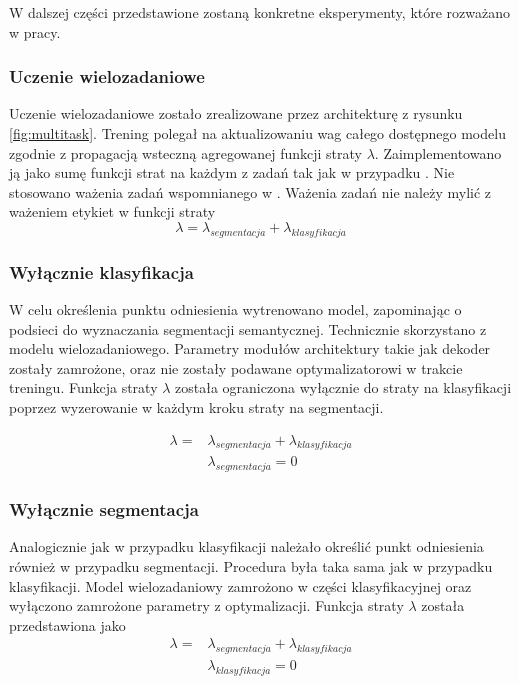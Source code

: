 W dalszej części przedstawione zostaną konkretne eksperymenty, które rozważano w pracy.

\subsubsection{Uczenie wielozadaniowe}
Uczenie wielozadaniowe zostało zrealizowane przez architekturę z rysunku \ref{fig:multitask}. Trening polegał na aktualizowaniu wag całego dostępnego modelu zgodnie z propagacją wsteczną agregowanej funkcji straty $\lambda$. Zaimplementowano ją jako sumę funkcji strat na każdym z zadań tak jak w przypadku \cite{mehta2018net}. Nie stosowano ważenia zadań wspomnianego w \cite{9892852}. Ważenia zadań nie należy mylić z ważeniem etykiet w funkcji straty
\begin{equation*}
\lambda = \lambda_{segmentacja} + \lambda_{klasyfikacja}
\end{equation*}

\subsubsection{Wyłącznie klasyfikacja}
W celu określenia punktu odniesienia wytrenowano model, zapominając o podsieci do wyznaczania segmentacji semantycznej. Technicznie skorzystano z modelu wielozadaniowego. Parametry modułów architektury takie jak dekoder zostały zamrożone, oraz nie zostały podawane optymalizatorowi w trakcie treningu. Funkcja straty $\lambda$ została ograniczona wyłącznie do straty na klasyfikacji poprzez wyzerowanie w każdym kroku straty na segmentacji.

\begin{align*}
\lambda  = & \lambda_{segmentacja} + \lambda_{klasyfikacja} \\
           & \lambda_{segmentacja} = 0
\end{align*}
\subsubsection{Wyłącznie segmentacja}
Analogicznie jak w przypadku klasyfikacji należało określić punkt odniesienia również w przypadku segmentacji. Procedura była taka sama jak w przypadku klasyfikacji. Model wielozadaniowy zamrożono w części klasyfikacyjnej oraz wyłączono zamrożone parametry z optymalizacji. Funkcja straty $\lambda$ została przedstawiona jako
\begin{align*}
\lambda = & \lambda_{segmentacja} + \lambda_{klasyfikacja} \\
          & \lambda_{klasyfikacja} = 0
\end{align*}
